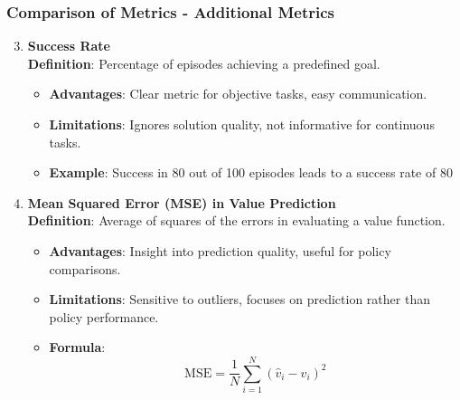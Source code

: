 \documentclass{beamer}
\begin{document}
\begin{frame}[fragile]
    \frametitle{Comparison of Metrics - Additional Metrics}
    \begin{enumerate}
        \setcounter{enumi}{2}
        \item \textbf{Success Rate} \\
        \textbf{Definition}: Percentage of episodes achieving a predefined goal.
        \begin{itemize}
            \item \textbf{Advantages}: Clear metric for objective tasks, easy communication.
            \item \textbf{Limitations}: Ignores solution quality, not informative for continuous tasks.
            \item \textbf{Example}: Success in 80 out of 100 episodes leads to a success rate of 80%
        \end{itemize}
        
        \item \textbf{Mean Squared Error (MSE) in Value Prediction} \\
        \textbf{Definition}: Average of squares of the errors in evaluating a value function.
        \begin{itemize}
            \item \textbf{Advantages}: Insight into prediction quality, useful for policy comparisons.
            \item \textbf{Limitations}: Sensitive to outliers, focuses on prediction rather than policy performance.
            \item \textbf{Formula}: 
            \begin{equation}
            \text{MSE} = \frac{1}{N}\sum_{i=1}^N (\hat{v}_i - v_i)^2
            \end{equation}
        \end{itemize}
    \end{enumerate}
\end{frame}
\end{document}

